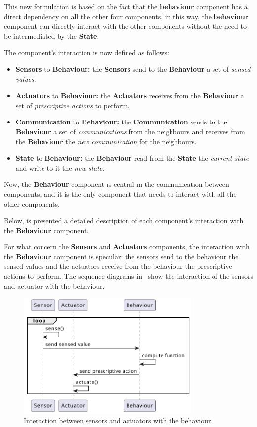 This new formulation is based on the fact that the \textbf{behaviour} component has a direct dependency on all the other four components,
in this way, the \textbf{behaviour} component can directly interact with the other components without the need to be intermediated by the
\textbf{State}.

The component's interaction is now defined as follows:
\begin{itemize}
	\item \textbf{Sensors} to \textbf{Behaviour:} the \textbf{Sensors} send to the \textbf{Behaviour} a set of \textit{sensed values}.
	\item \textbf{Actuators} to \textbf{Behaviour:} the \textbf{Actuators} receives from the \textbf{Behaviour} a set of \textit{prescriptive
		      actions} to perform.
	\item \textbf{Communication} to \textbf{Behaviour:} the \textbf{Communication} sends to the \textbf{Behaviour} a set of \textit{communications}
	      from the neighbours and receives from the \textbf{Behaviour} the \textit{new communication} for the neighbours.
	      \item\textbf{State} to \textbf{Behaviour:} the \textbf{Behaviour} read from the \textbf{State} the \textit{current state} and write to it
	      the \textit{new state}.
\end{itemize}

Now, the \textbf{Behaviour} component is central in the communication between components, and it is the only component that needs to interact with all the other components.

Below, is presented a detailed description of each component's interaction with the \textbf{Behaviour} component.

For what concern the \textbf{Sensors} and \textbf{Actuators} components, the interaction with the \textbf{Behaviour} component is specular: the
sensors send to the behaviour the sensed values and the actuators receive from the behaviour the prescriptive actions to perform.
The sequence diagrams in~ show the interaction of the sensors and actuator with the
behaviour.

\begin{figure}[ht]
	\centering
	\includegraphics[width=0.8\textwidth]{figures/sequence-diagram-sense-act.pdf}
	\caption{Interaction between sensors and actuators with the behaviour.}
	\label{fig:framework-components-interaction-2-sensors-actuators}
\end{figure}

